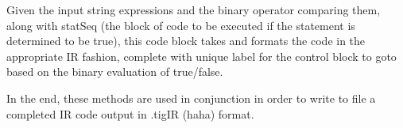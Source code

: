 \documentclass[a4paper]{article}
\begin{document}
Given the input string expressions and the binary operator comparing them, along with statSeq (the block of code to be executed if the statement is determined to be true), this code block takes and formats the code in the appropriate IR fashion, complete with unique label for the control block to goto based on the binary evaluation of true/false. 

In the end, these methods are used in conjunction in order to write to file a completed IR code output in .tigIR (haha) format. 
\end{document}
